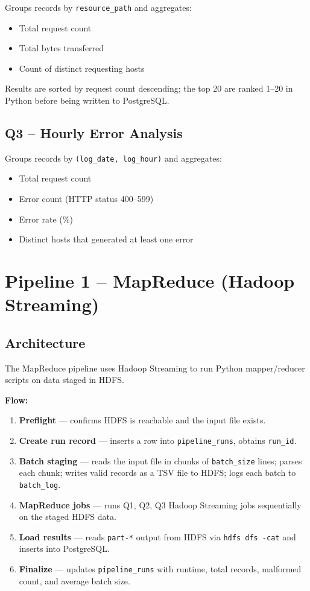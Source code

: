 \documentclass[12pt,a4paper]{article}
\begin{document}
Groups records by \texttt{resource\_path} and aggregates:
\begin{itemize}
  \item Total request count
  \item Total bytes transferred
  \item Count of distinct requesting hosts
\end{itemize}
Results are sorted by request count descending; the top 20 are ranked 1--20 in Python before
being written to PostgreSQL.

\subsection{Q3 -- Hourly Error Analysis}

Groups records by \texttt{(log\_date, log\_hour)} and aggregates:
\begin{itemize}
  \item Total request count
  \item Error count (HTTP status 400--599)
  \item Error rate (\%)
  \item Distinct hosts that generated at least one error
\end{itemize}

\section{Pipeline 1 -- MapReduce (Hadoop Streaming)}

\subsection{Architecture}

The MapReduce pipeline uses Hadoop Streaming to run Python mapper/reducer scripts on data
staged in HDFS.

\textbf{Flow:}
\begin{enumerate}
  \item \textbf{Preflight} --- confirms HDFS is reachable and the input file exists.
  \item \textbf{Create run record} --- inserts a row into \texttt{pipeline\_runs}, obtains
        \texttt{run\_id}.
  \item \textbf{Batch staging} --- reads the input file in chunks of \texttt{batch\_size} lines;
        parses each chunk; writes valid records as a TSV file to HDFS; logs each batch to
        \texttt{batch\_log}.
  \item \textbf{MapReduce jobs} --- runs Q1, Q2, Q3 Hadoop Streaming jobs sequentially on the
        staged HDFS data.
  \item \textbf{Load results} --- reads \texttt{part-*} output from HDFS via
        \texttt{hdfs dfs -cat} and inserts into PostgreSQL.
  \item \textbf{Finalize} --- updates \texttt{pipeline\_runs} with runtime, total records,
        malformed count, and average batch size.
\end{enumerate}
\end{document}
